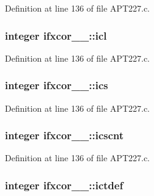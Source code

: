 Definition at line 136 of file A\+P\+T227.\+c.

\subsubsection[{\texorpdfstring{icl}{icl}}]{\setlength{\rightskip}{0pt plus 5cm}integer ifxcor\+\_\+\_\+\+::icl}\hypertarget{structifxcor__1___a66b285e5ddc84c89154a1e7de7fdf68a}{}\label{structifxcor__1___a66b285e5ddc84c89154a1e7de7fdf68a}


Definition at line 136 of file A\+P\+T227.\+c.

\subsubsection[{\texorpdfstring{ics}{ics}}]{\setlength{\rightskip}{0pt plus 5cm}integer ifxcor\+\_\+\_\+\+::ics}\hypertarget{structifxcor__1___a18932df5ee9d2d401cc2856d18d75737}{}\label{structifxcor__1___a18932df5ee9d2d401cc2856d18d75737}


Definition at line 136 of file A\+P\+T227.\+c.

\subsubsection[{\texorpdfstring{icscnt}{icscnt}}]{\setlength{\rightskip}{0pt plus 5cm}integer ifxcor\+\_\+\_\+\+::icscnt}\hypertarget{structifxcor__1___aa0f79c69e52037856ea612b421cd3818}{}\label{structifxcor__1___aa0f79c69e52037856ea612b421cd3818}


Definition at line 136 of file A\+P\+T227.\+c.

\subsubsection[{\texorpdfstring{ictdef}{ictdef}}]{\setlength{\rightskip}{0pt plus 5cm}integer ifxcor\+\_\+\_\+\+::ictdef}\hypertarget{structifxcor__1___abf3f6482f7eb96e4f944798e3668a6d2}{}\label{structifxcor__1___abf3f6482f7eb96e4f944798e3668a6d2}


